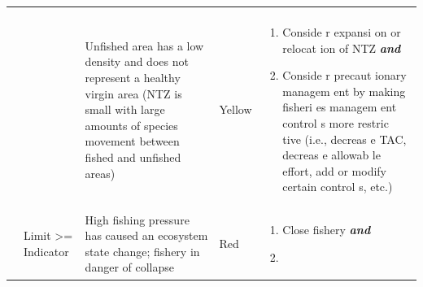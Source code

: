 \documentclass[]{book}
\begin{document}
\begin{longtable}[]{@{}lllll@{}}
\begin{minipage}[t]{0.19\columnwidth}
\end{minipage}\tabularnewline
\begin{minipage}[t]{0.19\columnwidth}\raggedright\strut
\strut
\end{minipage} & \begin{minipage}[t]{0.19\columnwidth}\raggedright\strut
\strut
\end{minipage} & \begin{minipage}[t]{0.19\columnwidth}\raggedright\strut
Unfished area has a low density and does not represent a healthy virgin
area (NTZ is small with large amounts of species movement between fished
and unfished areas)\strut
\end{minipage} & \begin{minipage}[t]{0.19\columnwidth}\raggedright\strut
Yellow\strut
\end{minipage} & \begin{minipage}[t]{0.19\columnwidth}\raggedright\strut
\begin{enumerate}
\def\labelenumi{\arabic{enumi}.}
\item
  Conside r expansi on or relocat ion of NTZ \textbf{\emph{and} }
\item
  Conside r precaut ionary managem ent by making fisheri es managem ent
  control s more restric tive (i.e., decreas e TAC, decreas e allowab le
  effort, add or modify certain control s, etc.)
\end{enumerate}\strut
\end{minipage}\tabularnewline
\begin{minipage}[t]{0.19\columnwidth}\raggedright\strut
\strut
\end{minipage} & \begin{minipage}[t]{0.19\columnwidth}\raggedright\strut
Limit \textgreater{}= Indicator\strut
\end{minipage} & \begin{minipage}[t]{0.19\columnwidth}\raggedright\strut
High fishing pressure has caused an ecosystem state change; fishery in
danger of collapse\strut
\end{minipage} & \begin{minipage}[t]{0.19\columnwidth}\raggedright\strut
Red\strut
\end{minipage} & \begin{minipage}[t]{0.19\columnwidth}\raggedright\strut
\begin{enumerate}
\def\labelenumi{\arabic{enumi}.}
\item
  Close fishery \textbf{\emph{and} }
\item

\end{enumerate}
\end{minipage}
\end{longtable}
\end{document}
